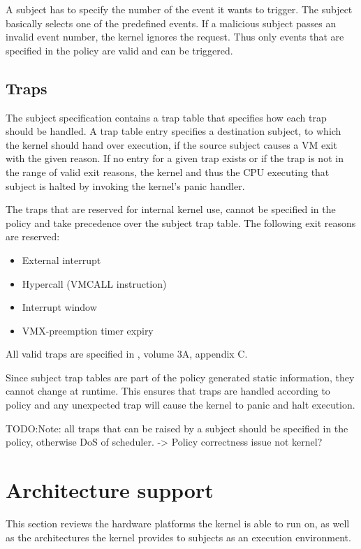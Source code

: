 A subject has to specify the number of the event it wants to trigger. The
subject basically selects one of the predefined events. If a malicious subject
passes an invalid event number, the kernel ignores the request. Thus only events
that are specified in the policy are valid and can be triggered.

\subsection{Traps}
The subject specification contains a trap table that specifies how each trap
should be handled. A trap table entry specifies a destination subject, to which
the kernel should hand over execution, if the source subject causes a VM exit
with the given reason. If no entry for a given trap exists or if the trap is not
in the range of valid exit reasons, the kernel and thus the CPU executing that
subject is halted by invoking the kernel's panic handler.

The traps that are reserved for internal kernel use, cannot be specified in the
policy and take precedence over the subject trap table. The following exit
reasons are reserved:

\begin{itemize}
	\item External interrupt
	\item Hypercall (VMCALL instruction)
	\item Interrupt window
	\item VMX-preemption timer expiry
\end{itemize}

All valid traps are specified in \cite{IntelSDM}, volume 3A, appendix C.

Since subject trap tables are part of the policy generated static information,
they cannot change at runtime. This ensures that traps are handled according to
policy and any unexpected trap will cause the kernel to panic and halt
execution.

TODO:Note: all traps that can be raised by a subject should be specified in the
policy, otherwise DoS of scheduler. -> Policy correctness issue not kernel?

\section{Architecture support}
This section reviews the hardware platforms the kernel is able to run on, as
well as the architectures the kernel provides to subjects as an execution
environment.

